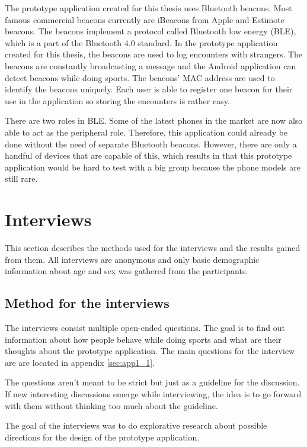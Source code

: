 
The prototype application created for this thesis uses Bluetooth beacons. Most famous commercial beacons currently are iBeacons from Apple and Estimote beacons. The beacons implement a protocol called Bluetooth low energy (BLE), which is a part of the Bluetooth 4.0 standard. In the prototype application created for this thesis, the beacons are used to log encounters with strangers. The beacons are constantly broadcasting a message and the Android application can detect beacons while doing sports. The beacons' MAC address are used to identify the beacons uniquely. Each user is able to register one beacon for their use in the application so storing the encounters is rather easy.

There are two roles in BLE. Some of the latest phones in the market are now also able to act as the peripheral role. Therefore, this application could already be done without the need of separate Bluetooth beacons. However, there are only a handful of devices that are capable of this, which results in that this prototype application would be hard to test with a big group because the phone models are still rare.

\section{Interviews}

This section describes the methods used for the interviews and the results gained from them. All interviews are anonymous and only basic demographic information about age and sex was gathered from the participants.

\subsection{Method for the interviews}

The interviews consist multiple open-ended questions. The goal is to find out information about how people behave while doing sports and what are their thoughts about the prototype application. The main questions for the interview are are located in appendix \ref{sec:app1_1}.

The questions aren't meant to be strict but just as a guideline for the discussion. If new interesting discussions emerge while interviewing, the idea is to go forward with them without thinking too much about the guideline.

The goal of the interviews was to do explorative research about possible directions for the design of the prototype application.

